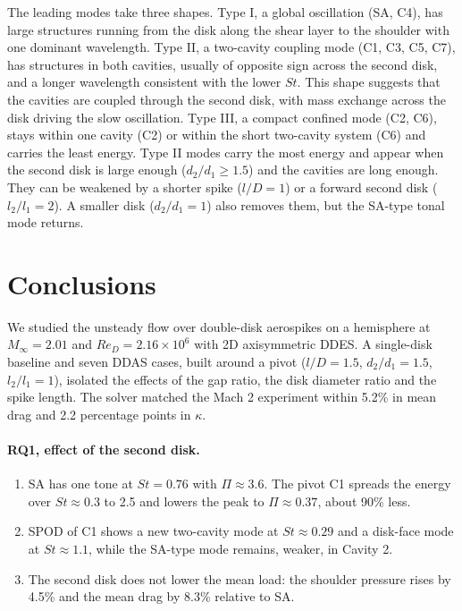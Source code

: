 \documentclass[11pt,a4paper]{article}
\newcommand{\ltl}{l_2/l_1}
\newcommand{\dtd}{d_2/d_1}
\begin{document}
The leading modes take three shapes. Type I, a global oscillation (SA, C4), has large structures running from the disk along the shear layer to the shoulder with one dominant wavelength. Type II, a two-cavity coupling mode (C1, C3, C5, C7), has structures in both cavities, usually of opposite sign across the second disk, and a longer wavelength consistent with the lower $St$. This shape suggests that the cavities are coupled through the second disk, with mass exchange across the disk driving the slow oscillation. Type III, a compact confined mode (C2, C6), stays within one cavity (C2) or within the short two-cavity system (C6) and carries the least energy. Type II modes carry the most energy and appear when the second disk is large enough ($\dtd \ge 1.5$) and the cavities are long enough. They can be weakened by a shorter spike ($l/D = 1$) or a forward second disk ($\ltl = 2$). A smaller disk ($\dtd = 1$) also removes them, but the SA-type tonal mode returns.

\section{Conclusions}\label{sec:conclusions}

We studied the unsteady flow over double-disk aerospikes on a hemisphere at $M_\infty = 2.01$ and $Re_D = 2.16\times10^6$ with 2D axisymmetric DDES. A single-disk baseline and seven DDAS cases, built around a pivot ($l/D = 1.5$, $\dtd = 1.5$, $\ltl = 1$), isolated the effects of the gap ratio, the disk diameter ratio and the spike length. The solver matched the Mach 2 experiment within 5.2\% in mean drag and 2.2 percentage points in $\kappa$.

\paragraph{RQ1, effect of the second disk.}
\begin{enumerate}
  \item SA has one tone at $St = 0.76$ with $\Pi \approx 3.6$. The pivot C1 spreads the energy over $St \approx 0.3$ to 2.5 and lowers the peak to $\Pi \approx 0.37$, about 90\% less.
  \item SPOD of C1 shows a new two-cavity mode at $St \approx 0.29$ and a disk-face mode at $St \approx 1.1$, while the SA-type mode remains, weaker, in Cavity 2.
  \item The second disk does not lower the mean load: the shoulder pressure rises by 4.5\% and the mean drag by 8.3\% relative to SA.
\end{enumerate}
\end{document}
